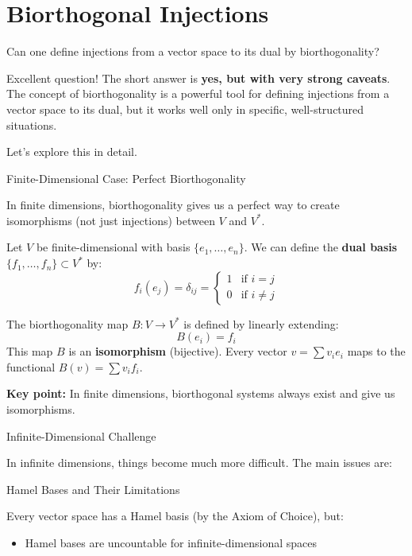\documentclass[aps,preprint]{revtex4}
\newenvironment{question}
  {\begin{tcolorbox}[colback=blue!5!white,colframe=blue!75!black,title=Question]}
  {\end{tcolorbox}}
\newenvironment{answer}
  {\begin{tcolorbox}[colback=green!5!white,colframe=green!75!black,title=Answer]}
  {\end{tcolorbox}}
\begin{document}
\section{Biorthogonal Injections}

\begin{question}
Can one define injections from a vector space to its dual by biorthogonality?
\end{question}

\begin{answer}
Excellent question! The short answer is \textbf{yes, but with very strong
caveats}. The concept of biorthogonality is a powerful tool for defining
injections from a vector space to its dual, but it works well only in
specific, well-structured situations.

Let's explore this in detail.

Finite-Dimensional Case: Perfect Biorthogonality

In finite dimensions, biorthogonality gives us a perfect way to create
isomorphisms (not just injections) between $V$ and $V^*$.

Let $V$ be finite-dimensional with basis $\{e_1, \dots, e_n\}$. We can
define the \textbf{dual basis} $\{f_1, \dots, f_n\} \subset V^*$ by: 
\begin{equation*}
f_i(e_j) = \delta_{ij} = 
\begin{cases}
1 & \text{if } i = j \\ 
0 & \text{if } i \neq j%
\end{cases}%
\end{equation*}

The biorthogonality map $B: V \to V^*$ is defined by linearly extending: 
\begin{equation*}
B(e_i) = f_i
\end{equation*}
This map $B$ is an \textbf{isomorphism} (bijective). Every vector $v = \sum
v_i e_i$ maps to the functional $B(v) = \sum v_i f_i$.

\textbf{Key point:} In finite dimensions, biorthogonal systems always exist
and give us isomorphisms.

Infinite-Dimensional Challenge

In infinite dimensions, things become much more difficult. The main issues
are:

Hamel Bases and Their Limitations

Every vector space has a Hamel basis (by the Axiom of Choice), but:

\begin{itemize}
\item Hamel bases are uncountable for infinite-dimensional spaces


\end{itemize}
\end{answer}
\end{document}
